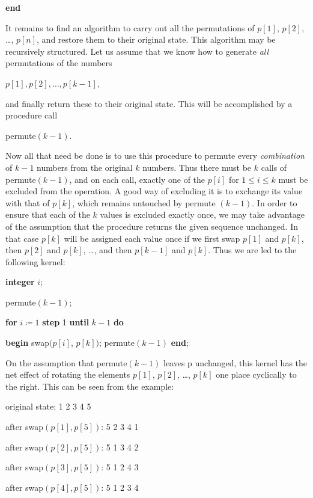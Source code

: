 \documentclass[twoside,11pt]{book}
\begin{document}
\quad \quad \textbf{end}

It remains to find an algorithm to carry out all the permutations of $p[1]$, $p[2]$, \dots, $p[n]$, and restore them to their original state. This algorithm may be recursively structured. Let us assume that we know how to generate \textit{all} permutations of the numbers

\quad $p[1], p[2], \dots, p[k - 1],$

\noindent
and finally return these to their original state. This will be accomplished by a procedure call

\quad permute$(k - 1)$.

\noindent
Now all that need be done is to use this procedure to permute every \textit{combination} of $k - 1$ numbers from the original $k$ numbers. Thus there must be $k$ calls of permute$(k - 1)$, and on each call, exactly one of the $p[i]$ for $1 \leqslant i \leqslant k$ must be excluded from the operation. A good way of excluding it is to exchange its value with that of $p[k]$, which remains untouched by permute $(k - 1)$. In order to ensure that each of the $k$ values is excluded exactly once, we may take advantage of the assumption that the procedure returns the given sequence unchanged. In that case $p[k]$ will be assigned each value once if we first swap $p[1]$ and $p[k]$, then $p[2]$ and $p[k]$, \dots, and then $p[k - 1]$ and $p[k]$. Thus we are led to the following kernel:

\quad \textbf{integer} $i$;

\quad permute$(k - 1)$;

\quad \textbf{for} $i\coloneq 1$ \textbf{step} 1 \textbf{until} $k - 1$ \textbf{do}

\quad \quad \textbf{begin} swap$(p[i]$, $p[k])$; permute$(k - 1)$ \textbf{end};

\noindent
On the assumption that permute$(k - 1)$ leaves p unchanged, this kernel has the net effect of rotating the elements $p[1]$, $p[2]$, \dots, $p[k]$ one place cyclically to the right. This can be seen from the example:

\quad original state:\tabto*{12em}  1 2 3 4 5

\quad after swap$(p[1], p[5])$:\tabto*{12em} 5 2 3 4 1

\quad after swap$(p[2], p[5])$:\tabto*{12em}  5 1 3 4 2

\quad after swap$(p[3], p[5])$:\tabto*{12em}  5 1 2 4 3

\quad after swap$(p[4], p[5])$:\tabto*{12em}  5 1 2 3 4
\end{document}
